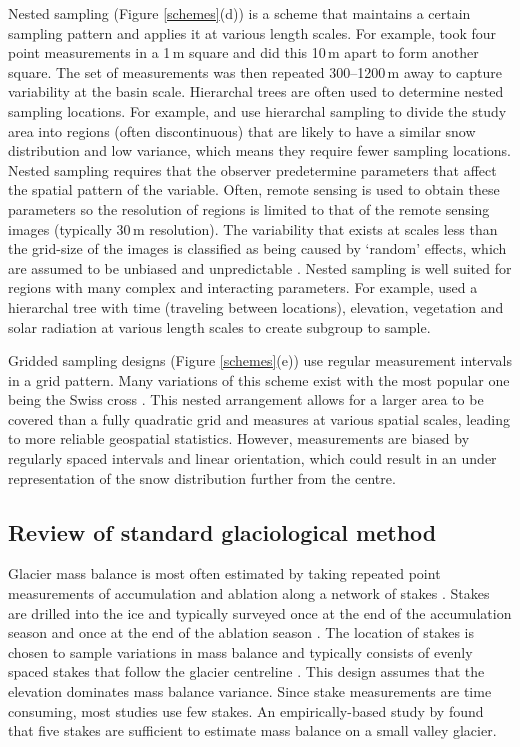 \documentclass{sfuthesis}
\begin{document}
Nested sampling (Figure \ref{schemes}(d)) is a scheme that maintains a certain sampling pattern and applies it at various length scales. For example, \cite{Schweizer2008} took four point measurements in a 1\,m square and did this 10\,m apart to form another square. The set of measurements was then repeated 300--1200\,m away to capture variability at the basin scale. Hierarchal trees are often used to determine nested sampling locations. For example, \cite{Watson2006} and \cite{Kasurak2011} use hierarchal sampling to divide the study area into regions (often discontinuous) that are likely to have a similar snow distribution and low variance, which means they require fewer sampling locations. Nested sampling requires that the observer predetermine parameters that affect the spatial pattern of the variable. Often, remote sensing is used to obtain these parameters so the resolution of regions is limited to that of the remote sensing images (typically 30\,m resolution). The variability that exists at scales less than the grid-size of the images is classified as being caused by `random' effects, which are assumed to be unbiased and unpredictable \citep{Watson2006}. Nested sampling is well suited for regions with many complex and interacting parameters. For example, \cite{Watson2006} used a hierarchal tree with time (traveling between locations), elevation, vegetation and solar radiation at various length scales to create subgroup to sample. 

Gridded sampling designs (Figure \ref{schemes}(e)) use regular measurement intervals in a grid pattern. Many variations of this scheme exist \citep{Molotch2005a, Kronholm2007, Lopez2011} with the most popular one being the Swiss cross \citep{Kronholm2004}. This nested arrangement allows for a larger area to be covered than a fully quadratic grid and measures at various spatial scales, leading to more reliable geospatial statistics. However, measurements are biased by regularly spaced intervals and linear orientation, which could result in an under representation of the snow distribution further from the centre. 

\subsection{Review of standard glaciological method}

Glacier mass balance is most often estimated by taking repeated point measurements of accumulation and ablation along a network of stakes \citep{Ostrem1991,Braithwaite2002,Kaser2002,Hubbard2005}. Stakes are drilled into the ice and typically surveyed once at the end of the accumulation season and once at the end of the ablation season \citep{Braithwaite2002,Cogley2011}. The location of stakes is chosen to sample variations in mass balance and typically consists of evenly spaced stakes that follow the glacier centreline \citep{Hubbard2005}. This design assumes that the elevation dominates mass balance variance. Since stake measurements are time consuming, most studies use few stakes. An empirically-based study by \cite{Fountain1999} found that five stakes are sufficient to estimate mass balance on a small valley glacier.
\end{document}
